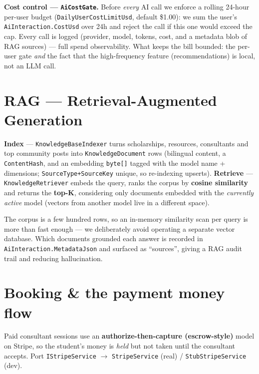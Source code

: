 \documentclass[11pt,a4paper]{article}
\newcommand{\code}[1]{\texttt{\textcolor{spInk}{#1}}}
\begin{document}
\begin{secbox}
\textbf{Cost control --- \code{AiCostGate}.} Before \emph{every} AI call we enforce a
rolling 24-hour per-user budget (\code{DailyUserCostLimitUsd}, default \$1.00): we
sum the user's \code{AiInteraction.CostUsd} over 24h and reject the call if this
one would exceed the cap. Every call is logged (provider, model, tokens, cost, and
a metadata blob of RAG sources) --- full spend observability. What keeps the bill
bounded: the per-user gate \emph{and} the fact that the high-frequency feature
(recommendations) is local, not an LLM call.
\end{secbox}

\section{RAG --- Retrieval-Augmented Generation}
\begin{howbox}
\textbf{Index} --- \code{KnowledgeBaseIndexer} turns scholarships, resources,
consultants and top community posts into \code{KnowledgeDocument} rows (bilingual
content, a \code{ContentHash}, and an embedding \code{byte[]} tagged with the model
name + dimensions; \code{SourceType+SourceKey} unique, so re-indexing upserts).
\textbf{Retrieve} --- \code{KnowledgeRetriever} embeds the query, ranks the corpus
by \textbf{cosine similarity} and returns the \textbf{top-K}, considering only
documents embedded with the \emph{currently active} model (vectors from another
model live in a different space).
\end{howbox}

\begin{whybox}
The corpus is a few hundred rows, so an in-memory similarity scan per query is
more than fast enough --- we deliberately avoid operating a separate vector
database. Which documents grounded each answer is recorded in
\code{AiInteraction.MetadataJson} and surfaced as ``sources'', giving a RAG audit
trail and reducing hallucination.
\end{whybox}

\section{Booking \& the payment money flow}
Paid consultant sessions use an \textbf{authorize-then-capture (escrow-style)}
model on Stripe, so the student's money is \emph{held} but not taken until the
consultant accepts. Port \code{IStripeService} $\rightarrow$ \code{StripeService}
(real) / \code{StubStripeService} (dev).
\end{document}

